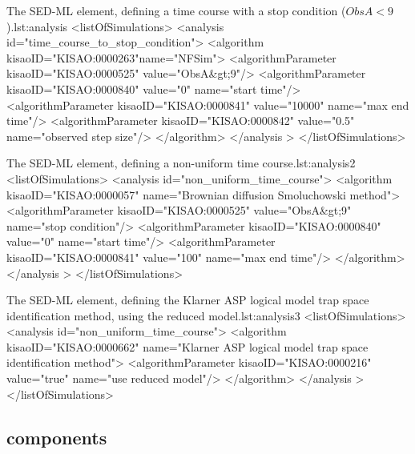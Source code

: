 
\begin{myXmlLst}{The SED-ML  element, defining a time course with a stop condition ($ObsA<9$).}{lst:analysis}
<listOfSimulations>
    <analysis id="time_course_to_stop_condition">
        <algorithm kisaoID="KISAO:0000263"name="NFSim">
            <algorithmParameter kisaoID="KISAO:0000525" value="ObsA&gt;9"/>
            <algorithmParameter kisaoID="KISAO:0000840" value="0" name="start time"/>
            <algorithmParameter kisaoID="KISAO:0000841" value="10000" name="max end time"/>
            <algorithmParameter kisaoID="KISAO:0000842" value="0.5" name="observed step size"/>
        </algorithm>
    </analysis >
</listOfSimulations>
\end{myXmlLst}


\begin{myXmlLst}{The SED-ML  element, defining a non-uniform time course.}{lst:analysis2}
<listOfSimulations>
    <analysis id="non_uniform_time_course">
        <algorithm kisaoID="KISAO:0000057" name="Brownian diffusion Smoluchowski method">
            <algorithmParameter kisaoID="KISAO:0000525" value="ObsA&gt;9" name="stop condition"/>
            <algorithmParameter kisaoID="KISAO:0000840" value="0" name="start time"/>
            <algorithmParameter kisaoID="KISAO:0000841" value="100" name="max end time"/>
        </algorithm>
    </analysis >
</listOfSimulations>
\end{myXmlLst}


\begin{myXmlLst}{The SED-ML  element, defining the Klarner ASP logical model trap space identification method, using the reduced model.}{lst:analysis3}
<listOfSimulations>
    <analysis id="non_uniform_time_course">
        <algorithm kisaoID="KISAO:0000662" name="Klarner ASP logical model trap space identification method">
            <algorithmParameter kisaoID="KISAO:0000216" value="true" name="use reduced model"/>
        </algorithm>
    </analysis >
</listOfSimulations>
\end{myXmlLst}


\subsection{ components}
\label{class:simulationComponents}

